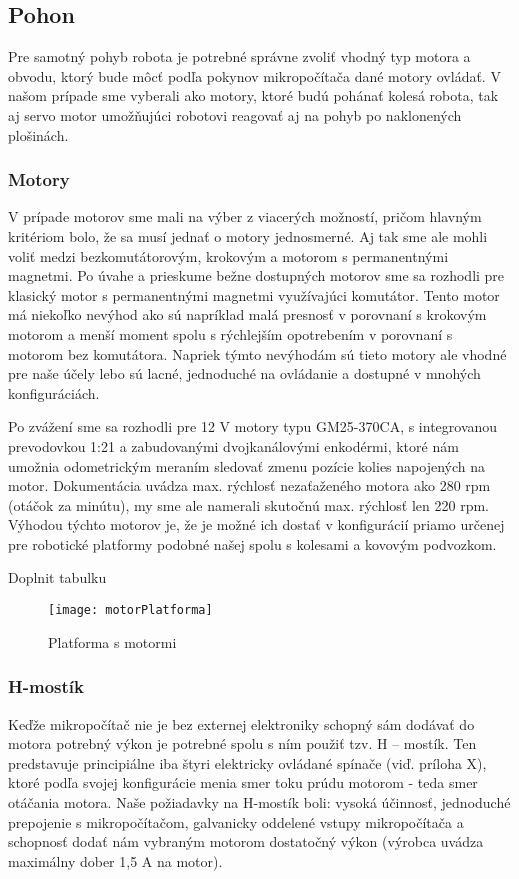 \subsection{Pohon}
Pre samotný pohyb robota je potrebné správne zvoliť vhodný typ motora a obvodu, ktorý bude môcť podľa pokynov mikropočítača dané motory ovládať. V našom prípade sme vyberali ako motory, ktoré budú pohánať kolesá robota, tak aj servo motor umožňujúci robotovi reagovať aj na pohyb po naklonených plošinách.

\subsubsection{Motory}
V prípade motorov sme mali na výber z viacerých možností, pričom hlavným kritériom bolo, že sa musí jednať o motory jednosmerné. Aj tak sme ale mohli voliť medzi bezkomutátorovým, krokovým a motorom s permanentnými magnetmi. Po úvahe a prieskume bežne dostupných motorov sme sa rozhodli pre klasický motor s permanentnými magnetmi využívajúci komutátor. Tento motor má niekoľko nevýhod ako sú napríklad malá presnosť v porovnaní s krokovým motorom a menší moment spolu s rýchlejším opotrebením v porovnaní s motorom bez komutátora. Napriek týmto nevýhodám sú tieto motory ale vhodné pre naše účely lebo sú lacné, jednoduché na ovládanie a dostupné v mnohých konfiguráciách. 

Po zvážení sme sa rozhodli pre 12 V motory typu GM25-370CA, s integrovanou prevodovkou 1:21 a zabudovanými dvojkanálovými enkodérmi, ktoré nám umožnia odometrickým meraním sledovať zmenu pozície kolies napojených na motor. Dokumentácia uvádza max. rýchlosť nezaťaženého motora ako 280 rpm (otáčok za minútu), my sme ale namerali skutočnú max. rýchlosť len 220 rpm. Výhodou týchto motorov je, že je možné ich dostať v konfigurácií priamo určenej pre robotické platformy podobné našej spolu s kolesami a kovovým podvozkom. 

\todo [inline] Doplnit tabulku

\begin{figure}
\centering
\texttt{[image: motorPlatforma]}
\caption{Platforma s motormi}
\label{fig:motorPlatforma}
\end{figure}

\subsubsection{H-mostík}
Keďže mikropočítač nie je bez externej elektroniky schopný sám dodávať do motora potrebný výkon je potrebné spolu s ním použiť tzv. H – mostík. Ten predstavuje principiálne iba štyri elektricky ovládané spínače (viď. príloha X), ktoré podľa svojej konfigurácie menia smer toku prúdu motorom - teda smer otáčania motora. Naše požiadavky na H-mostík boli: vysoká účinnosť, jednoduché prepojenie s mikropočítačom, galvanicky oddelené vstupy mikropočítača a  schopnosť dodať nám vybraným motorom dostatočný výkon (výrobca uvádza maximálny dober 1,5 A na motor). 

